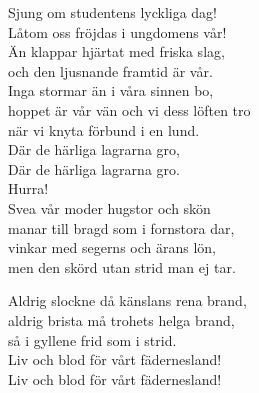 \documentclass[a6paper,10pt]{article}
\begin{document}
Sjung om studentens lyckliga dag!\\
Låtom oss fröjdas i ungdomens vår!\\
Än klappar hjärtat med friska slag,\\
och den ljusnande framtid är vår.
\vspace{5pt}\\
Inga stormar än i våra sinnen bo,\\
hoppet är vår vän och vi dess löften tro\\
när vi knyta förbund i en lund.\\
Där de härliga lagrarna gro,\\
Där de härliga lagrarna gro.\\
Hurra!
\vspace{5pt}\\
Svea vår moder hugstor och skön\\
manar till bragd som i fornstora dar,\\
vinkar med segerns och ärans lön,\\
men den skörd utan strid man ej tar.

\setlength{\oddsidemargin}{-0.37in}
\noindent
Aldrig slockne då känslans rena brand,\\
aldrig brista må trohets helga brand,\\
så i gyllene frid som i strid.\\
Liv och blod för vårt fädernesland!\\
Liv och blod för vårt fädernesland!
\vspace{20pt} 
\end{document}
